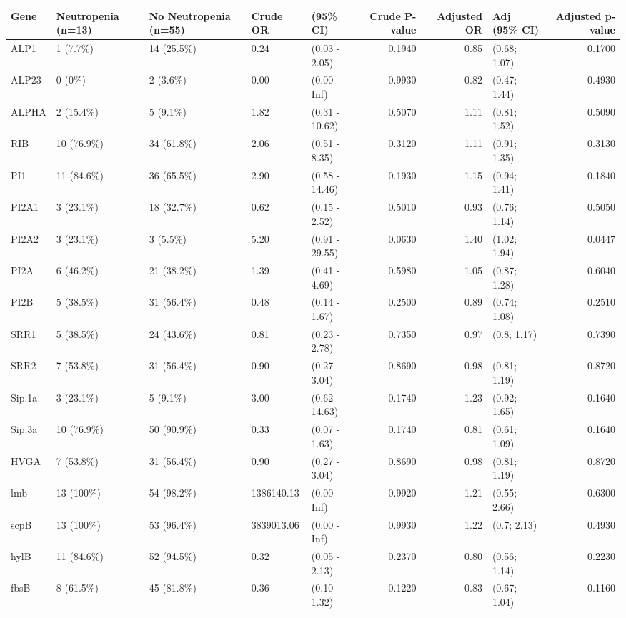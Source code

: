 \begin{table}[ht]
\centering
\begin{tabular}{lllllrrlr}
  \hline
Gene & Neutropenia (n=13) & No Neutropenia (n=55) & Crude OR & (95\% CI) & Crude P-value & Adjusted OR & Adj (95\% CI) & Adjusted p-value \\ 
  \hline
ALP1 & 1 (7.7\%) & 14 (25.5\%) & 0.24 & (0.03 - 2.05) & 0.1940 & 0.85 & (0.68; 1.07) & 0.1700 \\ 
  ALP23 & 0 (0\%) & 2 (3.6\%) & 0.00 & (0.00 - Inf) & 0.9930 & 0.82 & (0.47; 1.44) & 0.4930 \\ 
  ALPHA & 2 (15.4\%) & 5 (9.1\%) & 1.82 & (0.31 - 10.62) & 0.5070 & 1.11 & (0.81; 1.52) & 0.5090 \\ 
  RIB & 10 (76.9\%) & 34 (61.8\%) & 2.06 & (0.51 - 8.35) & 0.3120 & 1.11 & (0.91; 1.35) & 0.3130 \\ 
  PI1 & 11 (84.6\%) & 36 (65.5\%) & 2.90 & (0.58 - 14.46) & 0.1930 & 1.15 & (0.94; 1.41) & 0.1840 \\ 
  PI2A1 & 3 (23.1\%) & 18 (32.7\%) & 0.62 & (0.15 - 2.52) & 0.5010 & 0.93 & (0.76; 1.14) & 0.5050 \\ 
  PI2A2 & 3 (23.1\%) & 3 (5.5\%) & 5.20 & (0.91 - 29.55) & 0.0630 & 1.40 & (1.02; 1.94) & 0.0447 \\ 
  PI2A & 6 (46.2\%) & 21 (38.2\%) & 1.39 & (0.41 - 4.69) & 0.5980 & 1.05 & (0.87; 1.28) & 0.6040 \\ 
  PI2B & 5 (38.5\%) & 31 (56.4\%) & 0.48 & (0.14 - 1.67) & 0.2500 & 0.89 & (0.74; 1.08) & 0.2510 \\ 
  SRR1 & 5 (38.5\%) & 24 (43.6\%) & 0.81 & (0.23 - 2.78) & 0.7350 & 0.97 & (0.8; 1.17) & 0.7390 \\ 
  SRR2 & 7 (53.8\%) & 31 (56.4\%) & 0.90 & (0.27 - 3.04) & 0.8690 & 0.98 & (0.81; 1.19) & 0.8720 \\ 
  Sip.1a & 3 (23.1\%) & 5 (9.1\%) & 3.00 & (0.62 - 14.63) & 0.1740 & 1.23 & (0.92; 1.65) & 0.1640 \\ 
  Sip.3a & 10 (76.9\%) & 50 (90.9\%) & 0.33 & (0.07 - 1.63) & 0.1740 & 0.81 & (0.61; 1.09) & 0.1640 \\ 
  HVGA & 7 (53.8\%) & 31 (56.4\%) & 0.90 & (0.27 - 3.04) & 0.8690 & 0.98 & (0.81; 1.19) & 0.8720 \\ 
  lmb & 13 (100\%) & 54 (98.2\%) & 1386140.13 & (0.00 - Inf) & 0.9920 & 1.21 & (0.55; 2.66) & 0.6300 \\ 
  scpB & 13 (100\%) & 53 (96.4\%) & 3839013.06 & (0.00 - Inf) & 0.9930 & 1.22 & (0.7; 2.13) & 0.4930 \\ 
  hylB & 11 (84.6\%) & 52 (94.5\%) & 0.32 & (0.05 - 2.13) & 0.2370 & 0.80 & (0.56; 1.14) & 0.2230 \\ 
  fbsB & 8 (61.5\%) & 45 (81.8\%) & 0.36 & (0.10 - 1.32) & 0.1220 & 0.83 & (0.67; 1.04) & 0.1160 \\ 
   \hline
\end{tabular}
\end{table}

